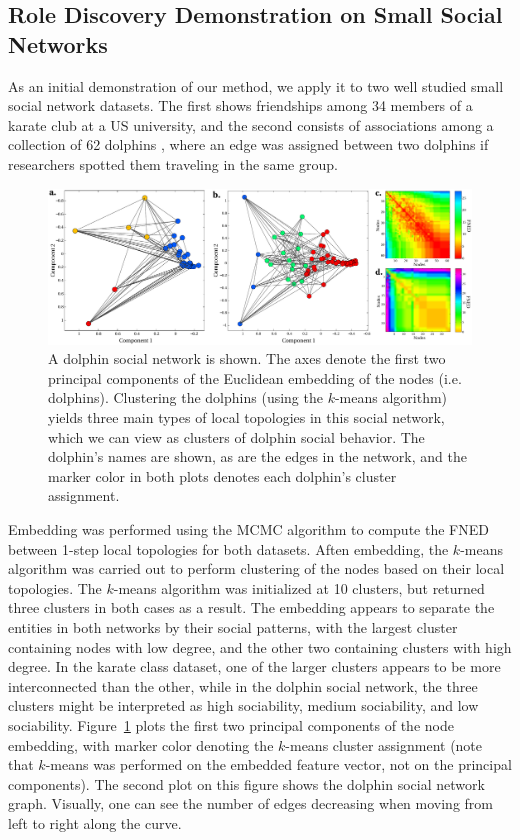 \documentclass{article}
\begin{document}
\subsection{Role Discovery Demonstration on Small Social Networks}
As an initial demonstration of our method, we apply it to two well studied small social network datasets. The first shows friendships among 34 members of a karate club at a US university, and the second consists of associations among a collection of 62 dolphins \cite{bottleNoseDolphinPeople}, where an edge was assigned between two dolphins if researchers spotted them traveling in the same group.
\begin{figure}[h!tbp]
  \centering               
  \includegraphics[width=1\textwidth]{fig/fig3.pdf}
  \caption{A dolphin social network is shown. The axes denote the first two principal components of the Euclidean embedding of the nodes (i.e. dolphins). Clustering the dolphins (using the $k$-means algorithm) yields three main types of local topologies in this social network, which we can view as clusters of dolphin social behavior. The dolphin's names are shown, as are the edges in the network, and the marker color in both plots denotes each dolphin's cluster assignment.}
  \label{fig:dolphinSocialNetwork}
\end{figure}

Embedding was performed using the MCMC algorithm to compute the FNED between 1-step local topologies for both datasets. Aften embedding, the $k$-means algorithm was carried out to perform clustering of the nodes based on their local topologies. The $k$-means algorithm was initialized at 10 clusters, but returned three clusters in both cases as a result. The embedding appears to separate the entities in both networks by their social patterns, with the largest cluster containing nodes with low degree, and the other two containing clusters with high degree. In the karate class dataset, one of the larger clusters appears to be more interconnected than the other, while in the dolphin social network, the three clusters might be interpreted as high sociability, medium sociability, and low sociability. Figure~\ref{fig:dolphinSocialNetwork} plots the first two principal components of the node embedding, with marker color denoting the $k$-means cluster assignment (note that $k$-means was performed on the embedded feature vector, not on the principal components). The second plot on this figure shows the dolphin social network graph. Visually, one can see the number of edges decreasing when moving from left to right along the curve.
\end{document}
